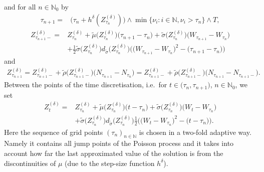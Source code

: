 \documentclass[11pt,a4paper]{article}
\numberwithin{equation}{section}
\theoremstyle{definition}
\newcommand{\N}{{\mathbb{N}}}
\begin{document}
and for all $n\in\N_0$ by 
\begin{equation}
\begin{aligned}\label{EqTauGen} 
\tau_{n+1} = & \big(\tau_n+ h^\delta(Z^{(\delta)}_{\tau_n})\big)\wedge \min\{\nu_i: i\in\N, \nu_i > \tau_{n}\} \wedge T, 
\end{aligned}
\end{equation}
\begin{equation}
\begin{aligned}\label{EqDefMSLL}
Z^{(\delta)}_{\tau_{n+1}-} =& Z^{(\delta)}_{\tau_{n}} + \widetilde \mu\big(Z^{(\delta)}_{\tau_{n}}\big)  \big(\tau_{n+1}- \tau_{n}\big) + \widetilde\sigma \big(Z^{(\delta)}_{\tau_{n}}\big)\big(W_{\tau_{n+1}} -W_{\tau_{n}}\big)  \\
&+ \frac{1}{2} \widetilde\sigma \big(Z^{(\delta)}_{\tau_{n}}\big) d_{\widetilde\sigma} \big(Z^{(\delta)}_{\tau_{n}}\big)  \big(\big(W_{\tau_{n+1}} -W_{\tau_{n}}\big)^2 -\big(\tau_{n+1}-\tau_{n}\big)\big)
\end{aligned}
\end{equation}
and 
\begin{equation}
\begin{aligned}\label{EqDefMS}
Z^{(\delta)}_{\tau_{n+1}} = Z^{(\delta)}_{\tau_{n+1}-} + \widetilde \rho\big(Z^{(\delta)}_{\tau_{n+1}-}\big) \big(N_{\tau_{n+1}}- N_{\tau_{n}}\big) = Z^{(\delta)}_{\tau_{n+1}-} + \widetilde \rho\big(Z^{(\delta)}_{\tau_{n+1}-}\big) \big(N_{\tau_{n+1}}- N_{\tau_{n+1}-}\big).
\end{aligned}
\end{equation}
Between the points of the time discretisation, i.e.~for $t\in\big(\tau_{n},\tau_{n+1}\big)$, $n\in\N_0$, we set
\begin{equation}
\begin{aligned}\label{EqDefMScont}
Z^{(\delta)}_{t} =& Z^{(\delta)}_{\tau_{n}} + \widetilde \mu\big(Z^{(\delta)}_{\tau_{n}}\big) \big(t- \tau_{n}\big) + \widetilde\sigma \big(Z^{(\delta)}_{\tau_{n}}\big) \big(W_{t} -W_{\tau_{n}}\big)  \\
&+ \widetilde\sigma \big(Z^{(\delta)}_{\tau_{n}}\big) d_{\widetilde\sigma} \big(Z^{(\delta)}_{\tau_{n}}\big) \frac{1}{2} \big(\big(W_{t} -W_{\tau_{n}}\big)^2 -\big(t-\tau_{n}\big)\big).
\end{aligned}
\end{equation}
Here the sequence of grid points $(\tau_n)_{n\in\N}$ is chosen in a two-fold adaptive way. Namely it contains all jump points of the Poisson process and it takes into account how far the last approximated value of the solution is from the discontinuities of $\mu$ (due to the step-size function $h^\delta$).
\end{document}
